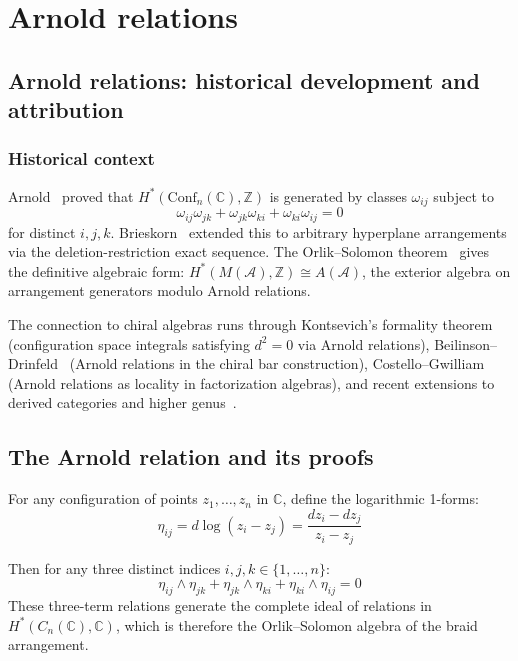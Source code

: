 \chapter{Arnold relations}\label{app:arnold-relations}



\section{Arnold relations: historical development and attribution}
\label{sec:arnold-historical}

\subsection{Historical context}

Arnold~\cite{Arnold69} proved that $H^*(\mathrm{Conf}_n(\mathbb{C}), \mathbb{Z})$ is generated by classes $\omega_{ij}$ subject to
\begin{equation}\label{eq:arnold-original}
\omega_{ij} \omega_{jk} + \omega_{jk} \omega_{ki} + \omega_{ki} \omega_{ij} = 0
\end{equation}
for distinct $i, j, k$.  Brieskorn~\cite{Brieskorn73} extended this to arbitrary hyperplane arrangements via the deletion-restriction exact sequence.  The Orlik--Solomon theorem~\cite{OS80} gives the definitive algebraic form: $H^*(M(\mathcal{A}), \mathbb{Z}) \cong A(\mathcal{A})$, the exterior algebra on arrangement generators modulo Arnold relations.

The connection to chiral algebras runs through Kontsevich's formality theorem~\cite{Kontsevich97} (configuration space integrals satisfying $d^2 = 0$ via Arnold relations), Beilinson--Drinfeld~\cite{BD04} (Arnold relations in the chiral bar construction), Costello--Gwilliam~\cite{CG17} (Arnold relations as locality in factorization algebras), and recent extensions to derived categories and higher genus~\cite{GLZ22, FG12}.

\section{The Arnold relation and its proofs}

\begin{theorem}
\label{thm:arnold-relations-appendix}
For any configuration of points $z_1, \ldots, z_n$ in $\mathbb{C}$, define the logarithmic 1-forms:
\[\eta_{ij} = d\log(z_i - z_j) = \frac{dz_i - dz_j}{z_i - z_j}\]

Then for any three distinct indices $i, j, k \in \{1, \ldots, n\}$:
\[\eta_{ij} \wedge \eta_{jk} + \eta_{jk} \wedge \eta_{ki} + \eta_{ki} \wedge \eta_{ij} = 0\]
These three-term relations generate the complete ideal of relations in $H^*(C_n(\mathbb{C}), \mathbb{C})$, which is therefore the Orlik--Solomon algebra of the braid arrangement.
\end{theorem}

